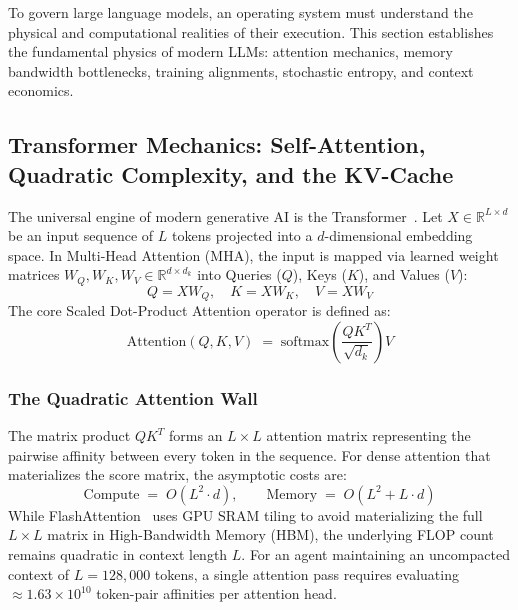 To govern large language models, an operating system must understand the physical and computational realities of their execution. This section establishes the fundamental physics of modern LLMs: attention mechanics, memory bandwidth bottlenecks, training alignments, stochastic entropy, and context economics.

\subsection{Transformer Mechanics: Self-Attention, Quadratic Complexity, and the KV-Cache}

The universal engine of modern generative AI is the Transformer~. Let $X \in \mathbb{R}^{L \times d}$ be an input sequence of $L$ tokens projected into a $d$-dimensional embedding space. In Multi-Head Attention (MHA), the input is mapped via learned weight matrices $W_Q, W_K, W_V \in \mathbb{R}^{d \times d_k}$ into Queries ($Q$), Keys ($K$), and Values ($V$):
\begin{equation}
Q = X W_Q, \quad K = X W_K, \quad V = X W_V
\end{equation}
The core Scaled Dot-Product Attention operator is defined as:
\begin{equation}\label{eq:attention-formula}
\mathrm{Attention}(Q, K, V) \;=\; \mathrm{softmax}\left( \frac{Q K^T}{\sqrt{d_k}} \right) V
\end{equation}

\subsubsection{The Quadratic Attention Wall}
The matrix product $Q K^T$ forms an $L \times L$ attention matrix representing the pairwise affinity between every token in the sequence. For dense attention that materializes the score matrix, the asymptotic costs are:
\begin{equation}
\mathrm{Compute} \;=\; O(L^2 \cdot d), \qquad \mathrm{Memory} \;=\; O(L^2 + L \cdot d)
\end{equation}
While FlashAttention~ uses GPU SRAM tiling to avoid materializing the full $L \times L$ matrix in High-Bandwidth Memory (HBM), the underlying FLOP count remains quadratic in context length $L$. For an agent maintaining an uncompacted context of $L = 128{,}000$ tokens, a single attention pass requires evaluating $\approx 1.63 \times 10^{10}$ token-pair affinities per attention head.

